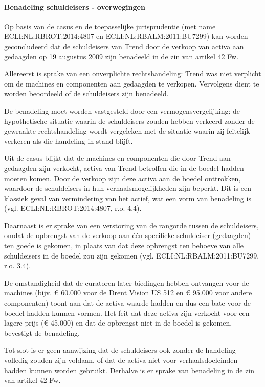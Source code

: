 \documentclass[
  dutch,
  a4paper,
]{article}
\begin{document}
\paragraph{Benadeling schuldeisers - overwegingen}\label{benadeling-schuldeisers---overwegingen-69}

Op basis van de casus en de toepasselijke jurisprudentie (met name ECLI:NL:RBROT:2014:4807 en ECLI:NL:RBALM:2011:BU7299) kan worden geconcludeerd dat de schuldeisers van Trend door de verkoop van activa aan gedaagden op 19 augustus 2009 zijn benadeeld in de zin van artikel 42 Fw.

Allereerst is sprake van een onverplichte rechtshandeling: Trend was niet verplicht om de machines en componenten aan gedaagden te verkopen. Vervolgens dient te worden beoordeeld of de schuldeisers zijn benadeeld.

De benadeling moet worden vastgesteld door een vermogensvergelijking: de hypothetische situatie waarin de schuldeisers zouden hebben verkeerd zonder de gewraakte rechtshandeling wordt vergeleken met de situatie waarin zij feitelijk verkeren als die handeling in stand blijft.

Uit de casus blijkt dat de machines en componenten die door Trend aan gedaagden zijn verkocht, activa van Trend betroffen die in de boedel hadden moeten komen. Door de verkoop zijn deze activa aan de boedel onttrokken, waardoor de schuldeisers in hun verhaalsmogelijkheden zijn beperkt. Dit is een klassiek geval van vermindering van het actief, wat een vorm van benadeling is (vgl. ECLI:NL:RBROT:2014:4807, r.o. 4.4).

Daarnaast is er sprake van een verstoring van de rangorde tussen de schuldeisers, omdat de opbrengst van de verkoop aan één specifieke schuldeiser (gedaagden) ten goede is gekomen, in plaats van dat deze opbrengst ten behoeve van alle schuldeisers in de boedel zou zijn gekomen (vgl. ECLI:NL:RBALM:2011:BU7299, r.o. 3.4).

De omstandigheid dat de curatoren later biedingen hebben ontvangen voor de machines (bijv. € 60.000 voor de Drent Vision US 512 en € 95.000 voor andere componenten) toont aan dat de activa waarde hadden en dus een bate voor de boedel hadden kunnen vormen. Het feit dat deze activa zijn verkocht voor een lagere prijs (€ 45.000) en dat de opbrengst niet in de boedel is gekomen, bevestigt de benadeling.

Tot slot is er geen aanwijzing dat de schuldeisers ook zonder de handeling volledig zouden zijn voldaan, of dat de activa niet voor verhaalsdoeleinden hadden kunnen worden gebruikt. Derhalve is er sprake van benadeling in de zin van artikel 42 Fw.
\end{document}
